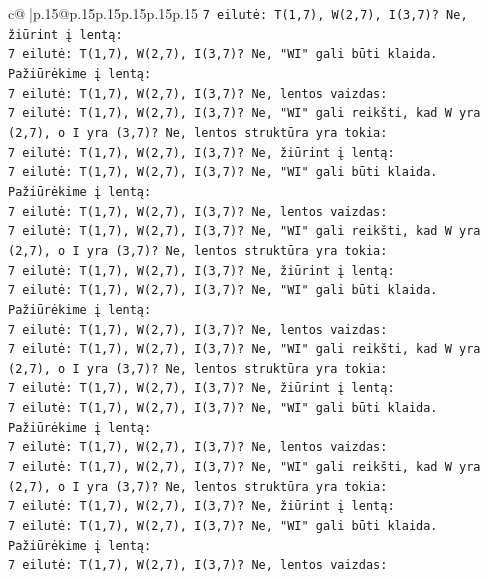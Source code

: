 \documentclass{article}
\begin{document}
{\begin{supertabular}{c@{$\;$}|p{.15\linewidth}@{}p{.15\linewidth}p{.15\linewidth}p{.15\linewidth}p{.15\linewidth}p{.15\linewidth}}
{{{\texttt{7 eilutė: T(1,7), W(2,7), I(3,7)? Ne, žiūrint į lentą:} \\
\texttt{7 eilutė: T(1,7), W(2,7), I(3,7)? Ne, "WI" gali būti klaida.} \\
\texttt{Pažiūrėkime į lentą:} \\
\texttt{7 eilutė: T(1,7), W(2,7), I(3,7)? Ne, lentos vaizdas:} \\
\texttt{7 eilutė: T(1,7), W(2,7), I(3,7)? Ne, "WI" gali reikšti, kad W yra (2,7), o I yra (3,7)? Ne, lentos struktūra yra tokia:} \\
\texttt{7 eilutė: T(1,7), W(2,7), I(3,7)? Ne, žiūrint į lentą:} \\
\texttt{7 eilutė: T(1,7), W(2,7), I(3,7)? Ne, "WI" gali būti klaida.} \\
\texttt{Pažiūrėkime į lentą:} \\
\texttt{7 eilutė: T(1,7), W(2,7), I(3,7)? Ne, lentos vaizdas:} \\
\texttt{7 eilutė: T(1,7), W(2,7), I(3,7)? Ne, "WI" gali reikšti, kad W yra (2,7), o I yra (3,7)? Ne, lentos struktūra yra tokia:} \\
\texttt{7 eilutė: T(1,7), W(2,7), I(3,7)? Ne, žiūrint į lentą:} \\
\texttt{7 eilutė: T(1,7), W(2,7), I(3,7)? Ne, "WI" gali būti klaida.} \\
\texttt{Pažiūrėkime į lentą:} \\
\texttt{7 eilutė: T(1,7), W(2,7), I(3,7)? Ne, lentos vaizdas:} \\
\texttt{7 eilutė: T(1,7), W(2,7), I(3,7)? Ne, "WI" gali reikšti, kad W yra (2,7), o I yra (3,7)? Ne, lentos struktūra yra tokia:} \\
\texttt{7 eilutė: T(1,7), W(2,7), I(3,7)? Ne, žiūrint į lentą:} \\
\texttt{7 eilutė: T(1,7), W(2,7), I(3,7)? Ne, "WI" gali būti klaida.} \\
\texttt{Pažiūrėkime į lentą:} \\
\texttt{7 eilutė: T(1,7), W(2,7), I(3,7)? Ne, lentos vaizdas:} \\
\texttt{7 eilutė: T(1,7), W(2,7), I(3,7)? Ne, "WI" gali reikšti, kad W yra (2,7), o I yra (3,7)? Ne, lentos struktūra yra tokia:} \\
\texttt{7 eilutė: T(1,7), W(2,7), I(3,7)? Ne, žiūrint į lentą:} \\
\texttt{7 eilutė: T(1,7), W(2,7), I(3,7)? Ne, "WI" gali būti klaida.} \\
\texttt{Pažiūrėkime į lentą:} \\
\texttt{7 eilutė: T(1,7), W(2,7), I(3,7)? Ne, lentos vaizdas:} \\
}}}
\end{supertabular}}
\end{document}
